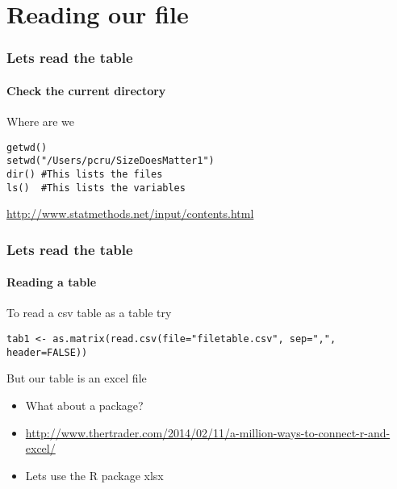 \documentclass{article}\usepackage[]{graphicx}\usepackage[]{color}
\begin{document}
\section*{Reading our file}
\begin{frame}[fragile]
  \frametitle{Lets read the table}
  \framesubtitle{Check the current directory}
\begin{block}{Where are we}
\begin{lstlisting} 
getwd()
setwd("/Users/pcru/SizeDoesMatter1")
dir() #This lists the files
ls()  #This lists the variables
\end{lstlisting}
\url{http://www.statmethods.net/input/contents.html}
\end{block}
\end{frame}

\begin{frame}[fragile]
  \frametitle{Lets read the table}
  \framesubtitle{Reading a table}
\begin{block}{To read a csv table as a table try}
\begin{lstlisting} 
tab1 <- as.matrix(read.csv(file="filetable.csv", sep=",", header=FALSE))
\end{lstlisting}
\end{block}
\begin{block}{But our table is an excel file}
\begin{itemize}
\item What about a package?
\item \url{http://www.thertrader.com/2014/02/11/a-million-ways-to-connect-r-and-excel/}
\item Lets use the R package xlsx
\end{itemize}
\end{block}
\end{frame}
\end{document}
